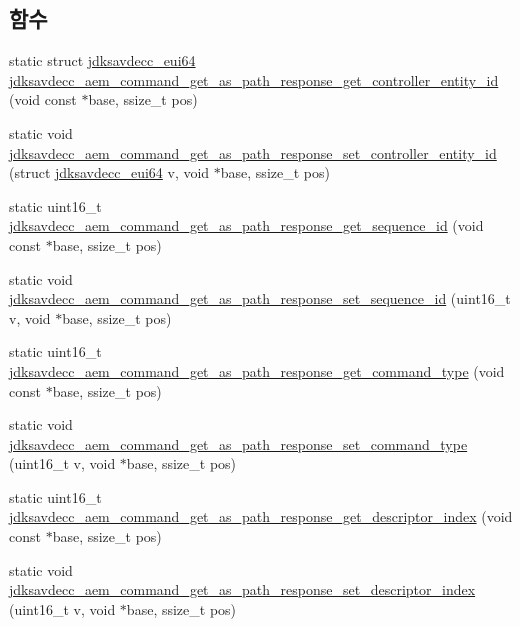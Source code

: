 \subsection*{함수}
\begin{DoxyCompactItemize}
\item 
static struct \hyperlink{structjdksavdecc__eui64}{jdksavdecc\+\_\+eui64} \hyperlink{group__command__get__as__path__response_gab7f7ae65fef28aa2c9d860e5ddff4766}{jdksavdecc\+\_\+aem\+\_\+command\+\_\+get\+\_\+as\+\_\+path\+\_\+response\+\_\+get\+\_\+controller\+\_\+entity\+\_\+id} (void const $\ast$base, ssize\+\_\+t pos)
\item 
static void \hyperlink{group__command__get__as__path__response_ga7b6ee2b220abd74c534b158eacfda718}{jdksavdecc\+\_\+aem\+\_\+command\+\_\+get\+\_\+as\+\_\+path\+\_\+response\+\_\+set\+\_\+controller\+\_\+entity\+\_\+id} (struct \hyperlink{structjdksavdecc__eui64}{jdksavdecc\+\_\+eui64} v, void $\ast$base, ssize\+\_\+t pos)
\item 
static uint16\+\_\+t \hyperlink{group__command__get__as__path__response_gaad5600319b8bfcb2629cdeb7529d1a28}{jdksavdecc\+\_\+aem\+\_\+command\+\_\+get\+\_\+as\+\_\+path\+\_\+response\+\_\+get\+\_\+sequence\+\_\+id} (void const $\ast$base, ssize\+\_\+t pos)
\item 
static void \hyperlink{group__command__get__as__path__response_ga0579c2f21c6491fb42eefcbfb436776c}{jdksavdecc\+\_\+aem\+\_\+command\+\_\+get\+\_\+as\+\_\+path\+\_\+response\+\_\+set\+\_\+sequence\+\_\+id} (uint16\+\_\+t v, void $\ast$base, ssize\+\_\+t pos)
\item 
static uint16\+\_\+t \hyperlink{group__command__get__as__path__response_gafbaae09c28578a6ad5265d7f838adc81}{jdksavdecc\+\_\+aem\+\_\+command\+\_\+get\+\_\+as\+\_\+path\+\_\+response\+\_\+get\+\_\+command\+\_\+type} (void const $\ast$base, ssize\+\_\+t pos)
\item 
static void \hyperlink{group__command__get__as__path__response_ga3c421b7cb1264e3e1af8ad8bd0e91807}{jdksavdecc\+\_\+aem\+\_\+command\+\_\+get\+\_\+as\+\_\+path\+\_\+response\+\_\+set\+\_\+command\+\_\+type} (uint16\+\_\+t v, void $\ast$base, ssize\+\_\+t pos)
\item 
static uint16\+\_\+t \hyperlink{group__command__get__as__path__response_ga444fc953127a21c02cb54de1ed945fea}{jdksavdecc\+\_\+aem\+\_\+command\+\_\+get\+\_\+as\+\_\+path\+\_\+response\+\_\+get\+\_\+descriptor\+\_\+index} (void const $\ast$base, ssize\+\_\+t pos)
\item 
static void \hyperlink{group__command__get__as__path__response_ga719d4b39e83410e70c20ba20af0902ac}{jdksavdecc\+\_\+aem\+\_\+command\+\_\+get\+\_\+as\+\_\+path\+\_\+response\+\_\+set\+\_\+descriptor\+\_\+index} (uint16\+\_\+t v, void $\ast$base, ssize\+\_\+t pos)

\end{DoxyCompactItemize}
